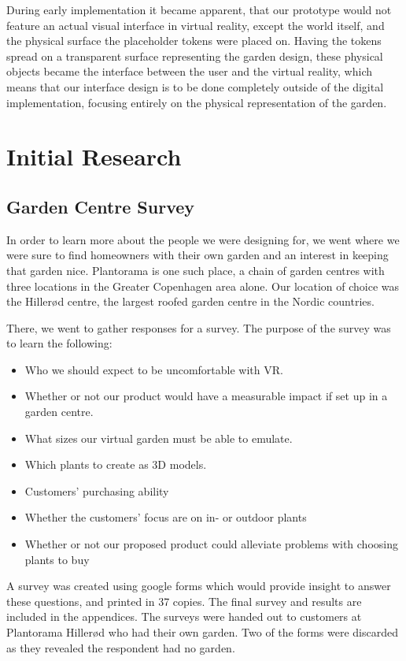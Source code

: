 During early implementation it became apparent, that our prototype would not feature an actual visual interface in virtual reality, except the world itself, and the physical surface the placeholder tokens were placed on.
Having the tokens spread on a transparent surface representing the garden design, these physical objects became the interface between the user and the virtual reality, which means that our interface design is to be done completely outside of the digital implementation, focusing entirely on the physical representation of the garden.



\section{Initial Research}
\subsection{Garden Centre Survey}

In order to learn more about the people we were designing for, we went where we were sure to find homeowners with their own garden and an interest in keeping that garden nice. Plantorama is one such place, a chain of garden centres with three locations in the Greater Copenhagen area alone. Our location of choice was the Hillerød centre, the largest roofed garden centre in the Nordic countries. 

There, we went to gather responses for a survey. 
The purpose of the survey was to learn the following:

\begin{itemize}
	\item Who we should expect to be uncomfortable with VR.
	\item Whether or not our product would have a measurable impact if set up in a garden centre.
	\item What sizes our virtual garden must be able to emulate.
	\item Which plants to create as 3D models.
	\item Customers' purchasing ability
	\item Whether the customers' focus are on in- or outdoor plants
	\item Whether or not our proposed product could alleviate problems with choosing plants to buy
\end{itemize}
A survey was created using google forms which would provide insight to answer these questions, and printed in 37 copies. The final survey and results are included in the appendices. The surveys were handed out to customers at Plantorama Hillerød who had their own garden. Two of the forms were discarded as they revealed the respondent had no garden. %

